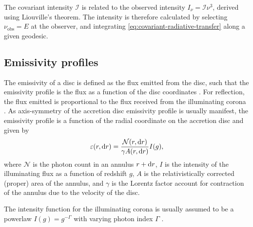 The covariant intensity $\mathcal{I}$ is related to the observed intensity $I_\nu = \mathcal{I} \nu^3$, derived using Liouville's theorem. The intensity is therefore calculated by selecting $\nu_\text{obs} = E$ at the observer, and integrating \eqref{eq:covariant-radiative-transfer} along a given geodesic. 


\subsection{Emissivity profiles}

The emissivity of a disc is defined as the flux emitted from the disc, such that the emissivity profile is the flux as a function of the disc coordinates \citep{wilkins_understanding_2012}. For reflection, the flux emitted is proportional to the flux received from the illuminating corona \citep{laor_line_1991}. As axis-symmetry of the accretion disc emissivity profile is usually manifest, the emissivity profile is a function of the radial coordinate on the accretion disc and given by
\begin{equation}
    \varepsilon (r, \text{d} r) = \frac{\mathcal{N}(r, \text{d} r)}{\gamma A(r, \text{d} r)} I(g),
\end{equation}
where $\mathcal{N}$ is the photon count in an annulus $r + \text{d} r$, $I$ is the intensity of the illuminating flux as a function of redshift $g$, $A$ is the relativistically corrected (proper) area of the annulus, and $\gamma$ is the Lorentz factor account for contraction of the annulus due to the velocity of the disc.

The intensity function for the illuminating corona is usually assumed to be a powerlaw $I(g) = g^{-\Gamma}$ with varying photon index $\Gamma$ \citep{gonzalez_probing_2017}.

